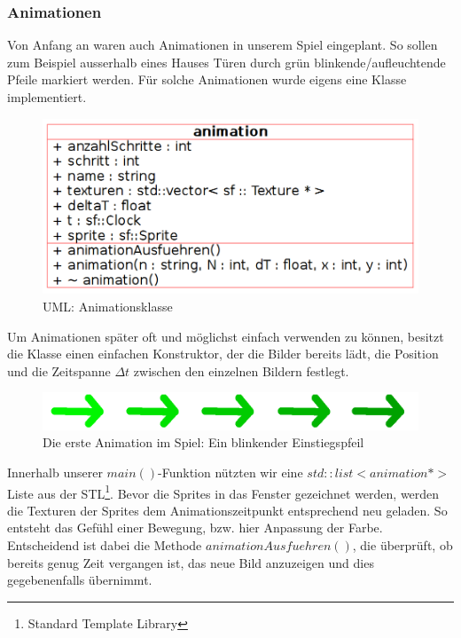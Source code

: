 \documentclass[12pt,a4paper]{scrartcl}
\begin{document}
\subsubsection{Animationen}
Von Anfang an waren auch Animationen in unserem Spiel eingeplant. So sollen zum Beispiel ausserhalb eines Hauses
Türen durch grün blinkende/aufleuchtende Pfeile markiert werden. Für solche Animationen wurde eigens eine Klasse
implementiert.
\begin{figure}[h]
	\centering
	\includegraphics[scale=0.3]{img/animation_uml.png}
	\caption{UML: Animationsklasse}
\end{figure}
Um Animationen später oft und möglichst einfach verwenden zu können, besitzt die Klasse einen einfachen Konstruktor,
der die Bilder bereits lädt, die Position und die Zeitspanne $\Delta t$ zwischen den einzelnen Bildern festlegt.
\begin{figure}[h]
	\centering
	\includegraphics[scale=0.3]{img/animation_pfeil.png}
	\caption{Die erste Animation im Spiel: Ein blinkender Einstiegspfeil}
\end{figure}
Innerhalb unserer $main()$-Funktion nützten wir eine $std::list<animation *>$ Liste aus der STL\footnote{Standard Template Library}.
Bevor die Sprites in das Fenster gezeichnet werden, werden die Texturen der Sprites dem Animationszeitpunkt entsprechend
neu geladen. So entsteht das Gefühl einer Bewegung, bzw. hier Anpassung der Farbe. Entscheidend ist dabei die Methode
$animationAusfuehren()$, die überprüft, ob bereits genug Zeit vergangen ist, das neue Bild anzuzeigen und dies gegebenenfalls
übernimmt.
\end{document}
